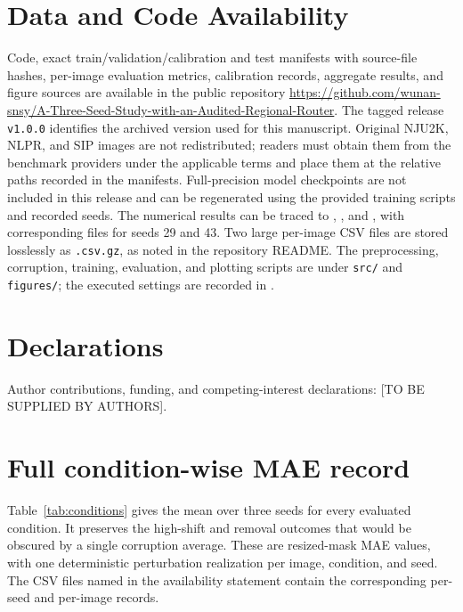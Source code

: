 \documentclass[11pt]{article}
\begin{document}
\section*{Data and Code Availability}
Code, exact train/validation/calibration and test manifests with source-file hashes, per-image evaluation metrics, calibration records, aggregate results, and figure sources are available in the public repository \url{https://github.com/wunan-snsy/A-Three-Seed-Study-with-an-Audited-Regional-Router}. The tagged release \texttt{v1.0.0} identifies the archived version used for this manuscript. Original NJU2K, NLPR, and SIP images are not redistributed; readers must obtain them from the benchmark providers under the applicable terms and place them at the relative paths recorded in the manifests. Full-precision model checkpoints are not included in this release and can be regenerated using the provided training scripts and recorded seeds. The numerical results can be traced to , , and , with corresponding files for seeds 29 and 43. Two large per-image CSV files are stored losslessly as \texttt{.csv.gz}, as noted in the repository README. The preprocessing, corruption, training, evaluation, and plotting scripts are under \texttt{src/} and \texttt{figures/}; the executed settings are recorded in .

\section*{Declarations}
Author contributions, funding, and competing-interest declarations: [TO BE SUPPLIED BY AUTHORS].


\appendix
\section{Full condition-wise MAE record}
Table~\ref{tab:conditions} gives the mean over three seeds for every evaluated condition. It preserves the high-shift and removal outcomes that would be obscured by a single corruption average. These are resized-mask MAE values, with one deterministic perturbation realization per image, condition, and seed. The CSV files named in the availability statement contain the corresponding per-seed and per-image records.
\end{document}
